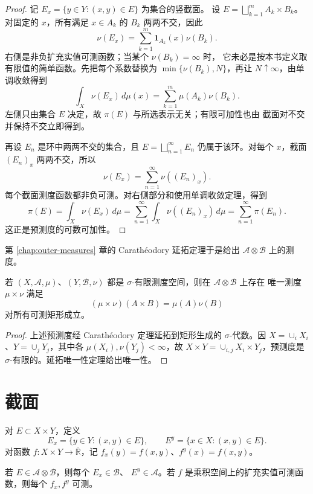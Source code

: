\begin{proof}
记 \(E_x=\{y\in Y:(x,y)\in E\}\) 为集合的竖截面。
设 \(E=\bigsqcup_{k=1}^{m}A_k\times B_k\)。对固定的 \(x\)，所有满足
\(x\in A_k\) 的 \(B_k\) 两两不交，因此
\[
 \nu(E_x)=\sum_{k=1}^{m}\mathbf1_{A_k}(x)\nu(B_k).
\]
右侧是非负扩充实值可测函数；当某个 \(\nu(B_k)=\infty\) 时，
它未必是按本书定义取有限值的简单函数。先把每个系数替换为
\(\min\{\nu(B_k),N\}\)，再让 \(N\uparrow\infty\)，由单调收敛得到
\[
 \int_X\nu(E_x)\,d\mu(x)
 =\sum_{k=1}^{m}\mu(A_k)\nu(B_k).
\]
左侧只由集合 \(E\) 决定，故 \(\pi(E)\) 与所选表示无关；有限可加性也由
截面对不交并保持不交立即得到。

再设 \(E_n\) 是环中两两不交的集合，且
\(E=\bigsqcup_{n=1}^{\infty}E_n\) 仍属于该环。对每个 \(x\)，截面
\((E_n)_x\) 两两不交，所以
\[
 \nu(E_x)=\sum_{n=1}^{\infty}\nu((E_n)_x).
\]
每个截面测度函数都非负可测。对右侧部分和使用单调收敛定理，得到
\[
 \pi(E)=\int_X\nu(E_x)\,d\mu
 =\sum_{n=1}^{\infty}\int_X\nu((E_n)_x)\,d\mu
 =\sum_{n=1}^{\infty}\pi(E_n).
\]
这正是预测度的可数可加性。
\end{proof}

第 \ref{chap:outer-measures} 章的 Carathéodory 延拓定理于是给出
\(\mathcal A\otimes\mathcal B\) 上的测度。

\begin{theorem}[乘积测度]
\label{thm:product-measure-existence}
若 \((X,\mathcal A,\mu)\)、\((Y,\mathcal B,\nu)\) 都是
\(\sigma\)-有限测度空间，则在 \(\mathcal A\otimes\mathcal B\) 上存在
唯一测度 \(\mu\times\nu\) 满足
\[
 (\mu\times\nu)(A\times B)=\mu(A)\nu(B)
\]
对所有可测矩形成立。
\end{theorem}

\begin{proof}
上述预测度经 Carathéodory 定理延拓到矩形生成的
\(\sigma\)-代数。因 \(X=\cup_iX_i\)、\(Y=\cup_jY_j\)，其中各
\(\mu(X_i),\nu(Y_j)<\infty\)，故
\(X\times Y=\cup_{i,j}X_i\times Y_j\)，预测度是
\(\sigma\)-有限的。延拓唯一性定理给出唯一性。
\end{proof}

\section{截面}

对 \(E\subset X\times Y\)，定义
\[
 E_x=\{y\in Y:(x,y)\in E\},\qquad
 E^y=\{x\in X:(x,y)\in E\}.
\]
对函数 \(f:X\times Y\to\overline{\mathbb R}\)，记
\(f_x(y)=f(x,y)\)、\(f^y(x)=f(x,y)\)。

\begin{proposition}[截面的可测性]
\label{prop:measurable-sections}
若 \(E\in\mathcal A\otimes\mathcal B\)，则每个 \(E_x\in\mathcal B\)、
\(E^y\in\mathcal A\)。若 \(f\) 是乘积空间上的扩充实值可测函数，则每个
\(f_x,f^y\) 可测。
\end{proposition}

